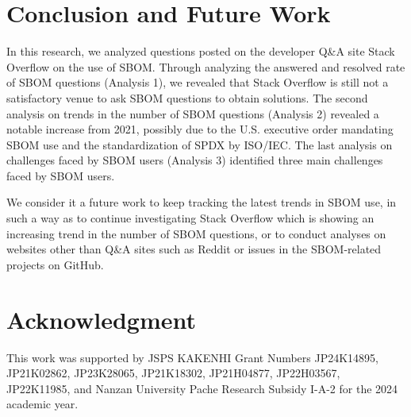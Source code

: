 \documentclass[conference]{IEEEtran}
\begin{document}
\section{Conclusion and Future Work}
\label{sec:conclusion}

In this research, we analyzed questions posted on the developer Q\&A site Stack Overflow on the use of SBOM. Through analyzing the answered and resolved rate of SBOM questions (Analysis 1), we revealed that Stack Overflow is still not a satisfactory venue to ask SBOM questions to obtain solutions. The second analysis on trends in the number of SBOM questions (Analysis 2) revealed a notable increase from 2021, possibly due to the U.S. executive order mandating SBOM use and the standardization of SPDX by ISO/IEC. The last analysis on challenges faced by SBOM users (Analysis 3) identified three main challenges faced by SBOM users.

We consider it a future work to keep tracking the latest trends in SBOM use, in such a way as to continue investigating Stack Overflow which is showing an increasing trend in the number of SBOM questions, or to conduct analyses on websites other than Q\&A sites such as Reddit or issues in the SBOM-related projects on GitHub.

\section*{Acknowledgment}
This work was supported by JSPS KAKENHI Grant Numbers
JP24K14895, %
JP21K02862, %
JP23K28065, %
JP21K18302, JP21H04877, JP22H03567, JP22K11985, %
and Nanzan University Pache Research Subsidy I-A-2 for the 2024 academic year. %



\end{document}
